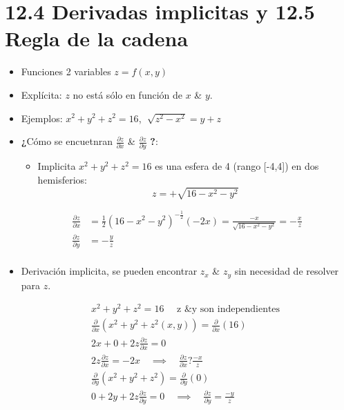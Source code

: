 \section{12.4 Derivadas implicitas y 12.5 Regla de la cadena }
\begin{itemize}
    \item Funciones 2 variables $z=f(x,y)$
    \item Explícita: $z$ no está sólo en función de $x$ \& $y$.
    \item Ejemplos: $x^2+y^2+z^2=16$, $\sqrt[]{z^2-x^2}=y+z$
    \item \textbf{¿}Cómo se encuetnran $\frac{\partial z}{\partial x }$ \& $\frac{\partial z}{\partial y} $ \textbf{?}:
        \begin{itemize}
            \item Implicita $x^2+y^2+z^2=16$ es una esfera de 4 (rango [-4,4]) en dos hemisferios:
                \[
                  z = +\sqrt{16-x^2-y^2}
                \]
        \end{itemize}
        \begin{center}
           \begin{align*}
               \frac{\partial z}{\partial x} &= \frac{1}{2} (16-x^2-y^2)^{-\frac{1}{2} }(-2x) = \frac{-x}{\sqrt{16-x^2-y^2}} = - \frac{x}{z} \\ 
               \frac{\partial z}{\partial y} &= -\frac{y}{z} \\  
           \end{align*}
        \end{center}
    
    \item Derivación implicita, se pueden encontrar $z_x$ \& $z_y$ sin necesidad de resolver para $z$.
        \begin{center}
           \begin{align*}
               x^2+y^2+z^2=16 \quad \text{  z \& y son independientes  } \\ 
               \frac{\partial }{\partial x}(x^2+y^2+z^2(x,y)) = \frac{\partial }{\partial x} (16) \\ 
               2x+0+2z \frac{\partial z}{\partial x} = 0 \\ 
               2z \frac{\partial z}{\partial x} = -2x  \quad  \implies \quad  \frac{\partial z}{\partial x} ? \frac{-x}{z} \\ 
                \frac{\partial }{\partial y} (x^2+y^2+z^2) = \frac{\partial }{\partial y}(0) \\ 
                0+2y+2z \frac{\partial z}{\partial y} = 0 \quad \implies \quad \frac{\partial z}{\partial y} = \frac{-y}{z} \\  
           \end{align*}
        \end{center}
\end{itemize}


